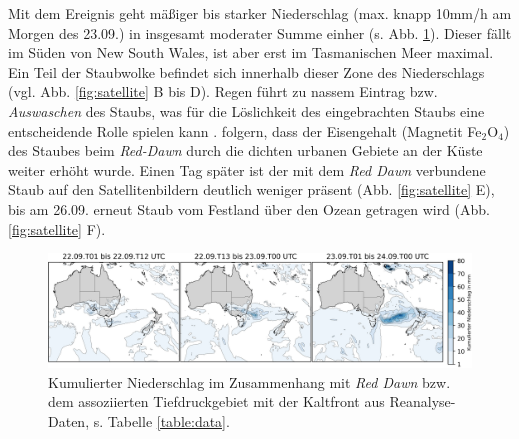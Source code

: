 \documentclass[12pt,a4paper,onecolumn]{scrartcl}
\begin{document}
Mit dem Ereignis geht mäßiger bis starker Niederschlag (max. knapp 10mm/h am Morgen des 23.09.) in insgesamt moderater Summe einher (s. Abb. \ref{fig:rain}). Dieser fällt im Süden von New South Wales, ist aber erst im Tasmanischen Meer maximal. Ein Teil der Staubwolke befindet sich innerhalb dieser Zone des Niederschlags (vgl. Abb. \ref{fig:satellite} B bis D). Regen führt zu nassem Eintrag bzw. \textit{Auswaschen} des Staubs, was  für die Löslichkeit des eingebrachten Staubs eine entscheidende Rolle spielen kann \citep{Shao.2011}. \citet{Reynolds.2014} folgern, dass der Eisengehalt (Magnetit Fe$_2$O$_4$) des Staubes beim \textit{Red-Dawn} durch die dichten urbanen Gebiete an der Küste weiter erhöht wurde. Einen Tag später ist der mit dem \textit{Red Dawn} verbundene Staub auf den Satellitenbildern deutlich weniger präsent (Abb. \ref{fig:satellite} E), bis am 26.09. erneut Staub vom Festland über den Ozean getragen wird (Abb. \ref{fig:satellite} F).
\begin{figure}[!htb]
\includegraphics[width=\textwidth]{bilder/reddawn/rain.png}
\caption{Kumulierter Niederschlag im Zusammenhang mit \textit{Red Dawn} bzw. dem assoziierten Tiefdruckgebiet mit der Kaltfront aus Reanalyse-Daten, s. Tabelle \ref{table:data}.} \label{fig:rain}
\end{figure}
\end{document}
